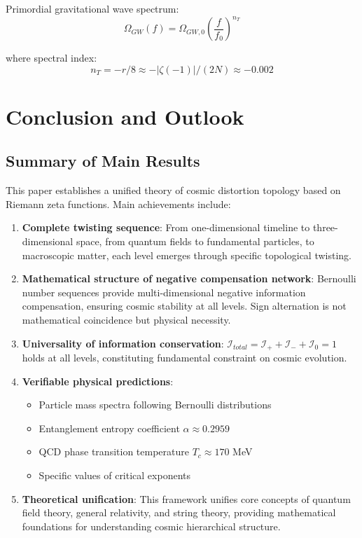 \documentclass[11pt]{article}
\begin{document}
Primordial gravitational wave spectrum:
$$\Omega_{GW}(f) = \Omega_{GW,0} \left(\frac{f}{f_0}\right)^{n_T}$$

where spectral index:
$$n_T = -r/8 \approx -|\zeta(-1)|/(2N) \approx -0.002$$

\section{Conclusion and Outlook}

\subsection{Summary of Main Results}

This paper establishes a unified theory of cosmic distortion topology based on Riemann zeta functions. Main achievements include:

\begin{enumerate}
\item \textbf{Complete twisting sequence}: From one-dimensional timeline to three-dimensional space, from quantum fields to fundamental particles, to macroscopic matter, each level emerges through specific topological twisting.

\item \textbf{Mathematical structure of negative compensation network}: Bernoulli number sequences provide multi-dimensional negative information compensation, ensuring cosmic stability at all levels. Sign alternation is not mathematical coincidence but physical necessity.

\item \textbf{Universality of information conservation}: $\mathcal{I}_{total} = \mathcal{I}_+ + \mathcal{I}_- + \mathcal{I}_0 = 1$ holds at all levels, constituting fundamental constraint on cosmic evolution.

\item \textbf{Verifiable physical predictions}:
   \begin{itemize}
   \item Particle mass spectra following Bernoulli distributions
   \item Entanglement entropy coefficient $\alpha \approx 0.2959$
   \item QCD phase transition temperature $T_c \approx 170$ MeV
   \item Specific values of critical exponents
   \end{itemize}

\item \textbf{Theoretical unification}: This framework unifies core concepts of quantum field theory, general relativity, and string theory, providing mathematical foundations for understanding cosmic hierarchical structure.
\end{enumerate}
\end{document}
